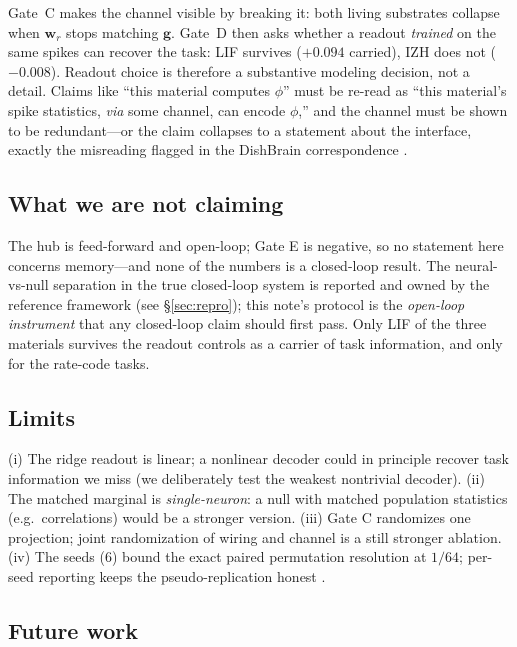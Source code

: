 \documentclass[10pt,a4paper]{article}
\begin{document}
Gate~C makes the channel visible by breaking it: both living
substrates collapse when $\mathbf{w}_r$ stops matching $\mathbf{g}$.
Gate~D then asks whether a readout \emph{trained} on the same spikes
can recover the task: LIF survives ($+0.094$ carried), IZH does not
($-0.008$). Readout choice is therefore a substantive modeling
decision, not a detail. Claims like ``this material computes $\phi$''
must be re-read as ``this material's spike statistics, \emph{via} some
channel, can encode $\phi$,'' and the channel must be shown to be
redundant---or the claim collapses to a statement about the interface,
exactly the misreading flagged in the DishBrain correspondence
\cite{balci2023neurons}.

\subsection{What we are not claiming}\label{sec:disc3}

The hub is feed-forward and open-loop; Gate E is negative, so no
statement here concerns memory---and none of the numbers is a
closed-loop result. The neural-vs-null separation in the true
closed-loop system is reported and owned by the reference framework
(see \S\ref{sec:repro}); this note's protocol is the \emph{open-loop
instrument} that any closed-loop claim should first pass. Only LIF of
the three materials survives the readout controls as a carrier of task
information, and only for the rate-code tasks.

\subsection{Limits}\label{sec:disc4}

(i) The ridge readout is linear; a nonlinear decoder could in
principle recover task information we miss (we deliberately test the
weakest nontrivial decoder). (ii) The matched marginal is
\emph{single-neuron}: a null with matched population statistics (e.g.\
correlations) would be a stronger version. (iii) Gate C randomizes one
projection; joint randomization of wiring and channel is a still
stronger ablation. (iv) The seeds ($6$) bound the exact paired
permutation resolution at $1/64$; per-seed reporting keeps the
pseudo-replication honest \cite{hurlbert1984}.

\subsection{Future work}\label{sec:disc5}
\end{document}
